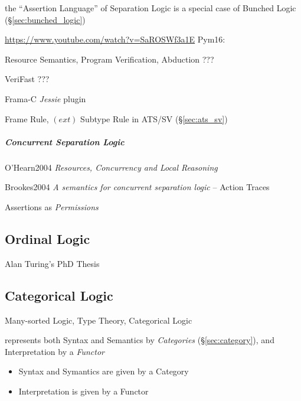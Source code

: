 the ``Assertion Language'' of Separation Logic is a special case of
Bunched Logic (\S\ref{sec:bunched_logic})


\url{https://www.youtube.com/watch?v=SaROSWf3a1E} Pym16:

Resource Semantics, Program Verification, Abduction ???

VeriFast ???

Frama-C \emph{Jessie} plugin

Frame Rule, \fist $(ext)$ Subtype Rule in ATS/SV (\S\ref{sec:ats_sv})



\subparagraph{Concurrent Separation Logic}
\label{sec:concurrent_separation}\hfill

O'Hearn2004 \emph{Resources, Concurrency and Local Reasoning}

Brookes2004 \emph{A semantics for concurrent separation logic} --
Action Traces

Assertions as \emph{Permissions}



\subsection{Ordinal Logic}\label{sec:ordinal_logic}

Alan Turing's PhD Thesis \cite{turing38}



\subsection{Categorical Logic}\label{sec:categorical_logic}

Many-sorted Logic, Type Theory, Categorical Logic

represents both Syntax and Semantics by \emph{Categories}
(\S\ref{sec:category}), and Interpretation by a \emph{Functor}

\begin{itemize}
  \item Syntax and Symantics are given by a Category
  \item Interpretation is given by a Functor
\end{itemize}

